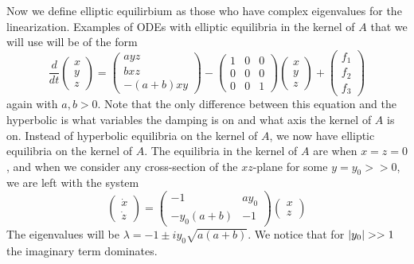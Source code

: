 \documentclass[11pt]{article}
\begin{document}
Now we define elliptic equilirbium as those who have complex eigenvalues for the linearization. Examples of ODEs with elliptic equilibria in the kernel of $A$ that we will use will be of the form
\begin{equation}\label{eq:elliptic}
    \frac{d}{dt} \begin{pmatrix} x \\ y \\ z 
    \end{pmatrix} = \begin{pmatrix}
        ayz\\
        bxz\\
        -(a+b)xy
    \end{pmatrix} - \begin{pmatrix}
        1 & 0 & 0 \\
        0 & 0 & 0 \\ 
        0 & 0 & 1 
    \end{pmatrix} \begin{pmatrix} x \\ y \\ z 
    \end{pmatrix} 
    + 
    \begin{pmatrix} f_1 \\ f_2 \\ f_3
    \end{pmatrix}
\end{equation}again with $a, b > 0$. Note that the only difference between this equation and the hyperbolic is what variables the damping is on and what axis the kernel of $A$ is on. Instead of hyperbolic equilibria on the kernel of $A$, we now have elliptic equilibria on the kernel of $A$. The equilibria in the kernel of $A$ are when $x = z = 0$, and when we consider any cross-section of the $xz$-plane for some $y = y_0>>0$, we are left with the system $$\begin{pmatrix}
    \dot{x}\\
    \dot{z}
\end{pmatrix} = \begin{pmatrix}
    -1 & ay_0\\
    -y_0(a + b) & -1
\end{pmatrix} \begin{pmatrix}
    x\\
    z
\end{pmatrix}$$The eigenvalues will be $\lambda = -1 \pm iy_0\sqrt{a(a + b)}$. We notice that for $\abs{y_0} >> 1$ the imaginary term dominates. 
\end{document}
